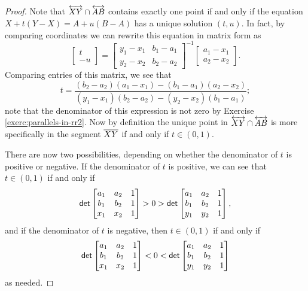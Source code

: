 \begin{proof}
Note that \(\overleftrightarrow{XY} \cap \overleftrightarrow{AB}\) contains exactly one point if and only if the equation \(X + t(Y-X) = A + u(B-A)\) has a unique solution \((t,u)\).
In fact, by comparing coordinates we can rewrite this equation in matrix form as \[ \begin{bmatrix} t \\ -u \end{bmatrix} = \begin{bmatrix} y_1 - x_1 & b_1 - a_1 \\ y_2 - x_2 & b_2 - a_2 \end{bmatrix}^{-1} \begin{bmatrix} a_1 - x_1 \\ a_2 - x_2 \end{bmatrix}. \]
Comparing entries of this matrix, we see that \[ t = \frac{(b_2-a_2)(a_1-x_1) - (b_1-a_1)(a_2-x_2)}{(y_1-x_1)(b_2-a_2) - (y_2-x_2)(b_1-a_1)}; \] note that the denominator of this expression is not zero by Exercise \ref{exerc:parallels-in-rr2}.
Now by definition the unique point in \(\overleftrightarrow{XY} \cap \overleftrightarrow{AB}\) is more specifically in the segment \(\overline{XY}\) if and only if \(t \in (0,1)\).

There are now two possibilities, depending on whether the denominator of \(t\) is positive or negative.
If the denominator of \(t\) is positive, we can see that \(t \in (0,1)\) if and only if \[ \mathsf{det} \begin{bmatrix} a_1 & a_2 & 1 \\ b_1 & b_2 & 1 \\ x_1 & x_2 & 1 \end{bmatrix} > 0 > \mathsf{det} \begin{bmatrix} a_1 & a_2 & 1 \\ b_1 & b_2 & 1 \\ y_1 & y_2 & 1 \end{bmatrix}, \]
and if the denominator of \(t\) is negative, then \(t \in (0,1)\) if and only if \[ \mathsf{det} \begin{bmatrix} a_1 & a_2 & 1 \\ b_1 & b_2 & 1 \\ x_1 & x_2 & 1 \end{bmatrix} < 0 < \mathsf{det} \begin{bmatrix} a_1 & a_2 & 1 \\ b_1 & b_2 & 1 \\ y_1 & y_2 & 1 \end{bmatrix} \] as needed.
\end{proof}

